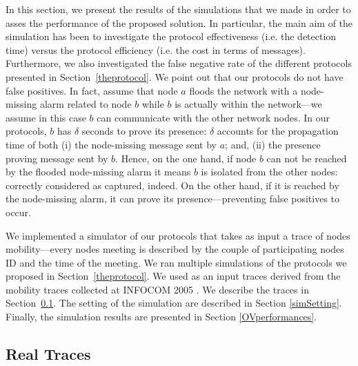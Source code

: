 \documentclass{IEEEconf}
\begin{document}
In this section, we present the results of the simulations that we made in order to asses the performance of the proposed solution. In particular, the main aim of the simulation has been to investigate the protocol effectiveness (i.e. the detection time) versus the protocol efficiency (i.e. the cost in terms of messages). Furthermore, we also investigated the false negative rate of the different protocols presented in Section~\ref{theprotocol}.
We point out that our protocols do not have false positives. In fact, assume that node $a$ floods the network with a node-missing alarm related to node $b$ while $b$ is actually within the network---we assume in this case $b$ can communicate with the other network nodes. In our protocols, $b$ has $\delta$ seconds to prove its presence: $\delta$ accounts for the propagation time of both (i) the node-missing message sent by $a$; and, (ii) the presence proving message sent by $b$. Hence, on the one hand, if node $b$ can not be reached by the flooded node-missing alarm it means $b$ is isolated from the other nodes: correctly considered as captured, indeed.
On the other hand, if it is reached by the node-missing alarm, it can prove its presence---preventing false positives to occur.



We implemented a simulator of our protocols that takes as input a trace of nodes mobility---every nodes meeting is described by the couple of participating nodes ID and the time of the meeting.
We ran multiple simulations of the protocols we proposed in Section~\ref{theprotocol}. We used as an input traces derived from the mobility traces collected at INFOCOM 2005 \cite{CRAWDAD-INFOCOM}. We describe the traces in Section~\ref{the-infocom-trace}. The setting of the simulation are described in Section \ref{simSetting}. Finally, the simulation results are presented in Section \ref{OVperformances}.









\subsection{Real Traces}
\label{the-infocom-trace}
\end{document}
